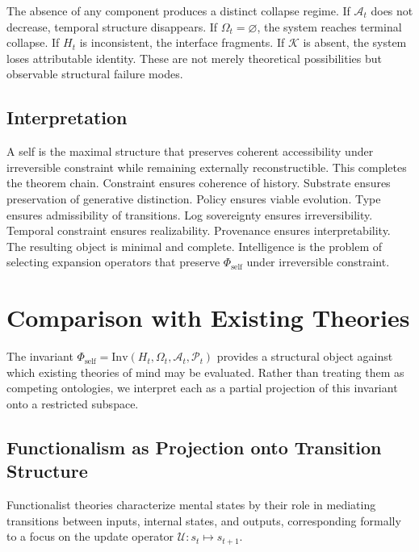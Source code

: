 \documentclass[12pt, a4paper]{article}
\theoremstyle{plain}
\theoremstyle{definition}
\theoremstyle{remark}
\begin{document}
The absence of any component produces a distinct collapse regime. If $\mathcal{A}_t$ does not decrease, temporal structure disappears. If $\Omega_t = \varnothing$, the system reaches terminal collapse. If $H_t$ is inconsistent, the interface fragments. If $\mathcal{K}$ is absent, the system loses attributable identity. These are not merely theoretical possibilities but observable structural failure modes.

\subsection{Interpretation}

A self is the maximal structure that preserves coherent accessibility under irreversible constraint while remaining externally reconstructible. This completes the theorem chain. Constraint ensures coherence of history. Substrate ensures preservation of generative distinction. Policy ensures viable evolution. Type ensures admissibility of transitions. Log sovereignty ensures irreversibility. Temporal constraint ensures realizability. Provenance ensures interpretability. The resulting object is minimal and complete. Intelligence is the problem of selecting expansion operators that preserve $\Phi_{\mathrm{self}}$ under irreversible constraint.

\section{Comparison with Existing Theories}

The invariant $\Phi_{\mathrm{self}} = \mathrm{Inv}(H_t, \Omega_t, \mathcal{A}_t, \mathcal{P}_t)$ provides a structural object against which existing theories of mind may be evaluated. Rather than treating them as competing ontologies, we interpret each as a partial projection of this invariant onto a restricted subspace.

\subsection{Functionalism as Projection onto Transition Structure}

Functionalist theories characterize mental states by their role in mediating transitions between inputs, internal states, and outputs, corresponding formally to a focus on the update operator $\mathcal{U} : s_t \mapsto s_{t+1}$.
\end{document}
